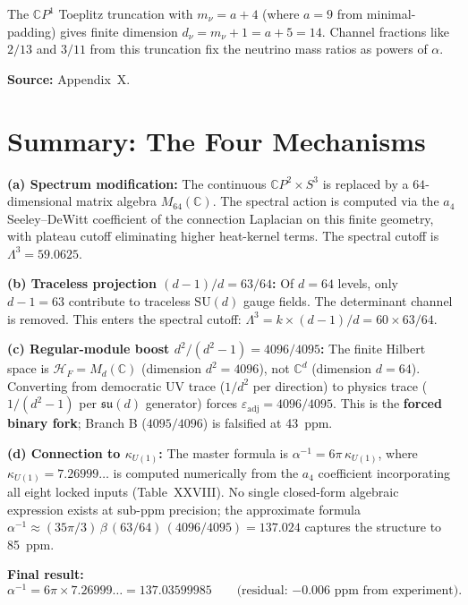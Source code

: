 \documentclass[12pt,a4paper]{article}
\begin{document}
The $\mathbb{C}P^1$ Toeplitz truncation with $m_\nu = a + 4$ (where
$a = 9$ from minimal-padding) gives finite dimension
$d_\nu = m_\nu + 1 = a + 5 = 14$. Channel fractions like $2/13$ and
$3/11$ from this truncation fix the neutrino mass ratios as powers of
$\alpha$.

\textbf{Source:} Appendix~X.

\section{Summary: The Four Mechanisms}
\label{sec:summary}

\begin{tcolorbox}[colback=blue!5!white, colframe=blue!50!black,
  title=Toeplitz Truncation at $d=64$: Complete Mathematical Anatomy]

\textbf{(a) Spectrum modification:}
The continuous $\mathbb{C}P^2 \times S^3$ is replaced by a $64$-dimensional
matrix algebra $M_{64}(\mathbb{C})$. The spectral action is computed via
the $a_4$ Seeley--DeWitt coefficient of the connection Laplacian on this
finite geometry, with plateau cutoff eliminating higher heat-kernel terms.
The spectral cutoff is $\Lambda^3 = 59.0625$.

\textbf{(b) Traceless projection $(d-1)/d = 63/64$:}
Of $d = 64$ levels, only $d-1 = 63$ contribute to traceless $\mathrm{SU}(d)$
gauge fields. The determinant channel is removed. This enters the spectral
cutoff: $\Lambda^3 = k \times (d-1)/d = 60 \times 63/64$.

\textbf{(c) Regular-module boost $d^2/(d^2-1) = 4096/4095$:}
The finite Hilbert space is $\mathcal{H}_F = M_d(\mathbb{C})$ (dimension
$d^2 = 4096$), not $\mathbb{C}^d$ (dimension $d = 64$). Converting from
democratic UV trace ($1/d^2$ per direction) to physics trace ($1/(d^2-1)$
per $\mathfrak{su}(d)$ generator) forces $\varepsilon_{\mathrm{adj}}
= 4096/4095$. This is the \textbf{forced binary fork}; Branch B
($4095/4096$) is falsified at 43~ppm.

\textbf{(d) Connection to $\kappa_{U(1)}$:}
The master formula is $\alpha^{-1} = 6\pi\,\kappa_{U(1)}$, where
$\kappa_{U(1)} = 7.26999\ldots$ is computed numerically from the $a_4$
coefficient incorporating all eight locked inputs (Table~XXVIII).
No single closed-form algebraic expression exists at sub-ppm precision;
the approximate formula
$\alpha^{-1} \approx (35\pi/3)\,\beta\,(63/64)\,(4096/4095) = 137.024$
captures the structure to 85~ppm.

\textbf{Final result:}
\begin{equation}
\alpha^{-1} = 6\pi \times 7.26999\ldots = 137.03599985
\qquad\text{(residual: $-0.006$~ppm from experiment)}.
\end{equation}
\end{tcolorbox}
\end{document}
